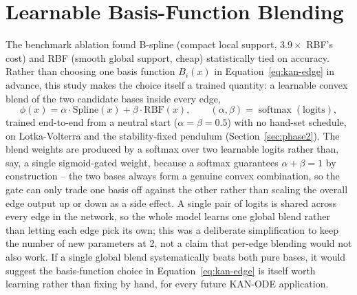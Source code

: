\section{Learnable Basis-Function Blending}
\label{sec:track-c}

The benchmark ablation found B-spline (compact local support, $3.9\times$
RBF's cost) and RBF (smooth global support, cheap) statistically tied on
accuracy. Rather than choosing one basis function $B_i(x)$ in
Equation~\ref{eq:kan-edge} in advance, this study makes the choice itself a
trained quantity: a learnable convex blend of the two candidate bases inside
every edge,
\begin{equation}
\phi(x) = \alpha\cdot\mathrm{Spline}(x) + \beta\cdot\mathrm{RBF}(x),
\qquad (\alpha,\beta) = \operatorname{softmax}(\text{logits}),
\label{eq:hybrid-basis}
\end{equation}
trained end-to-end from a neutral start ($\alpha=\beta=0.5$) with no
hand-set schedule, on Lotka-Volterra and the stability-fixed pendulum
(Section~\ref{sec:phase2}). The blend weights are produced by a softmax over
two learnable logits rather than, say, a single sigmoid-gated weight,
because a softmax guarantees $\alpha+\beta=1$ by construction -- the two
bases always form a genuine convex combination, so the gate can only trade
one basis off against the other rather than scaling the overall edge output
up or down as a side effect. A single pair of logits is shared across every
edge in the network, so the whole model learns one global blend rather than
letting each edge pick its own; this was a deliberate simplification to keep
the number of new parameters at 2, not a claim that per-edge blending would
not also work. If a single global blend systematically beats both pure
bases, it would suggest the basis-function choice in Equation~\ref{eq:kan-edge}
is itself worth learning rather than fixing by hand, for every future
KAN-ODE application.

